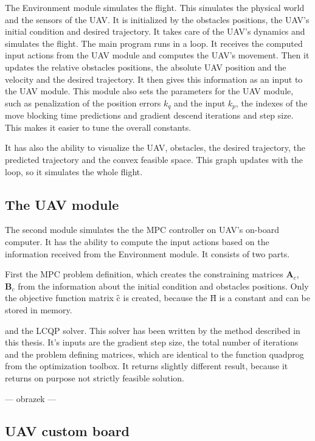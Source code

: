 \documentclass{article}
\newcommand{\macHr}{\textbf{\^H}}
\newcommand{\maccr}{\textbf{\^c}}
\begin{document}
The Environment module simulates the flight. This simulates the physical world and the sensors of the UAV. It is initialized by the obstacles positions, the UAV's initial condition and desired trajectory. It takes care of the UAV's dynamics and simulates the flight. The main program runs in a loop. It receives the computed input actions from the UAV module and computes the UAV's movement. Then it updates the relative obstacles positions, the absolute UAV position and the velocity and the desired trajectory. It then gives this information as an input to the UAV module. 
This module also sets the parameters for the UAV module, such as penalization of the position errors $k_q$ and the input $k_p$, the indexes of the move blocking time predictions and gradient descend iterations and step size. This makes it easier to tune the overall constants.

It has also the ability to visualize the UAV, obstacles, the desired trajectory, the predicted trajectory and the convex feasible space. This graph updates with the loop, so it simulates the whole flight. 

\subsection{The UAV module}

The second module simulates the the MPC controller on UAV's on-board computer. It has the ability to compute the input actions based on the information received from the Environment module. It consists of two parts. 

First the MPC problem definition, which creates the constraining matrices $\textbf{A}_c$, $\textbf{B}_c$ from the information about the initial condition and obstacles positions. Only the objective function matrix $\maccr$ is created, because the $\macHr$ is a constant and can be stored in memory.

 and the LCQP solver. This solver has been written by the method described in this thesis. It's inputs are the gradient step size, the total number of iterations and the problem defining matrices, which are identical to the function quadprog from the optimization toolbox. It returns slightly different result, because it returns on purpose not strictly feasible solution. 

--- obrazek ---

\subsection{UAV custom board}
\end{document}
